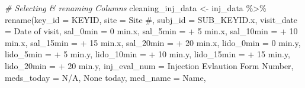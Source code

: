 \documentclass[
]{article}
\newenvironment{Shaded}{\begin{snugshade}}{\end{snugshade}}
\newcommand{\AttributeTok}[1]{\textcolor[rgb]{0.77,0.63,0.00}{#1}}
\newcommand{\CommentTok}[1]{\textcolor[rgb]{0.56,0.35,0.01}{\textit{#1}}}
\newcommand{\FunctionTok}[1]{\textcolor[rgb]{0.00,0.00,0.00}{#1}}
\newcommand{\NormalTok}[1]{#1}
\newcommand{\OtherTok}[1]{\textcolor[rgb]{0.56,0.35,0.01}{#1}}
\newcommand{\SpecialCharTok}[1]{\textcolor[rgb]{0.00,0.00,0.00}{#1}}
\newcommand{\StringTok}[1]{\textcolor[rgb]{0.31,0.60,0.02}{#1}}
\begin{document}
\begin{Shaded}
\begin{Highlighting}[]
\CommentTok{\# Selecting \& renaming Columns}
\NormalTok{cleaning\_inj\_data }\OtherTok{\textless{}{-}}\NormalTok{ inj\_data }\SpecialCharTok{\%\textgreater{}\%} 
  \FunctionTok{rename}\NormalTok{(}\AttributeTok{key\_id              =}\NormalTok{ KEYID,}
         \AttributeTok{site                =} \StringTok{\textasciigrave{}}\AttributeTok{Site \#}\StringTok{\textasciigrave{}}\NormalTok{,}
         \AttributeTok{subj\_id             =} \StringTok{\textasciigrave{}}\AttributeTok{SUB\_KEYID.x}\StringTok{\textasciigrave{}}\NormalTok{,}
         \AttributeTok{visit\_date          =} \StringTok{\textasciigrave{}}\AttributeTok{Date of visit}\StringTok{\textasciigrave{}}\NormalTok{,}
         \AttributeTok{sal\_0min            =} \StringTok{\textasciigrave{}}\AttributeTok{0 min.x}\StringTok{\textasciigrave{}}\NormalTok{,}
         \AttributeTok{sal\_5min            =} \StringTok{\textasciigrave{}}\AttributeTok{+ 5 min.x}\StringTok{\textasciigrave{}}\NormalTok{,}
         \AttributeTok{sal\_10min           =} \StringTok{\textasciigrave{}}\AttributeTok{+ 10 min.x}\StringTok{\textasciigrave{}}\NormalTok{,}
         \AttributeTok{sal\_15min           =} \StringTok{\textasciigrave{}}\AttributeTok{+ 15 min.x}\StringTok{\textasciigrave{}}\NormalTok{,}
         \AttributeTok{sal\_20min           =} \StringTok{\textasciigrave{}}\AttributeTok{+ 20 min.x}\StringTok{\textasciigrave{}}\NormalTok{,}
         \AttributeTok{lido\_0min           =} \StringTok{\textasciigrave{}}\AttributeTok{0 min.y}\StringTok{\textasciigrave{}}\NormalTok{,}
         \AttributeTok{lido\_5min           =} \StringTok{\textasciigrave{}}\AttributeTok{+ 5 min.y}\StringTok{\textasciigrave{}}\NormalTok{,}
         \AttributeTok{lido\_10min          =} \StringTok{\textasciigrave{}}\AttributeTok{+ 10 min.y}\StringTok{\textasciigrave{}}\NormalTok{,}
         \AttributeTok{lido\_15min          =} \StringTok{\textasciigrave{}}\AttributeTok{+ 15 min.y}\StringTok{\textasciigrave{}}\NormalTok{,}
         \AttributeTok{lido\_20min          =} \StringTok{\textasciigrave{}}\AttributeTok{+ 20 min.y}\StringTok{\textasciigrave{}}\NormalTok{,}
         \AttributeTok{inj\_eval\_num        =} \StringTok{\textasciigrave{}}\AttributeTok{Injection Evlaution Form Number}\StringTok{\textasciigrave{}}\NormalTok{,}
         \AttributeTok{meds\_today          =} \StringTok{\textasciigrave{}}\AttributeTok{N/A, None today}\StringTok{\textasciigrave{}}\NormalTok{,}
         \AttributeTok{med\_name            =}\NormalTok{ Name,}

\end{Highlighting}
\end{Shaded}
\end{document}
